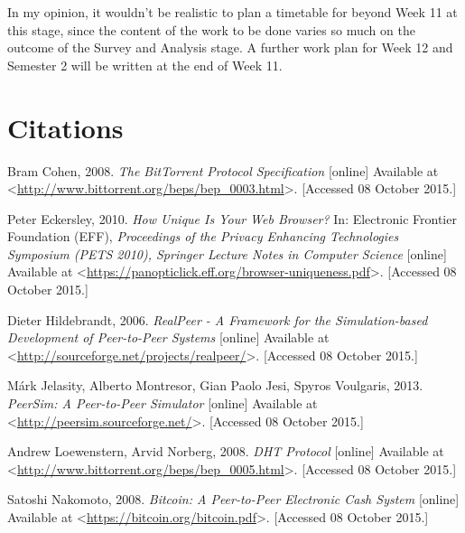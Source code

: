 \documentclass{article}
\begin{document}
In my opinion, it wouldn't be realistic to plan a timetable for beyond Week 11 at this stage, since the content of the work to be done varies so much on the outcome of the Survey and Analysis stage.  A further work plan for Week 12 and Semester 2 will be written at the end of Week 11.

\section{Citations}
Bram Cohen, 2008.  \emph{The BitTorrent Protocol Specification} [online] Available at <\url{http://www.bittorrent.org/beps/bep_0003.html}>.  [Accessed 08 October 2015.]

Peter Eckersley, 2010.  \emph{How Unique Is Your Web Browser?} In: Electronic Frontier Foundation (EFF), \emph{Proceedings of the Privacy Enhancing Technologies Symposium (PETS 2010), Springer Lecture Notes in Computer Science} [online] Available at <\url{https://panopticlick.eff.org/browser-uniqueness.pdf}>.  [Accessed 08 October 2015.]

Dieter Hildebrandt, 2006.  \emph{RealPeer - A Framework for the Simulation-based Development of Peer-to-Peer Systems} [online] Available at <\url{http://sourceforge.net/projects/realpeer/}>.  [Accessed 08 October 2015.]

Márk Jelasity, Alberto Montresor, Gian Paolo Jesi, Spyros Voulgaris, 2013.  \emph{PeerSim: A Peer-to-Peer Simulator} [online] Available at <\url{http://peersim.sourceforge.net/}>.  [Accessed 08 October 2015.]

Andrew Loewenstern, Arvid Norberg, 2008.  \emph{DHT Protocol} [online] Available at <\url{http://www.bittorrent.org/beps/bep_0005.html}>.  [Accessed 08 October 2015.]

Satoshi Nakomoto, 2008.  \emph{Bitcoin: A Peer-to-Peer Electronic Cash System} [online] Available at <\url{https://bitcoin.org/bitcoin.pdf}>.  [Accessed 08 October 2015.]
\end{document}
